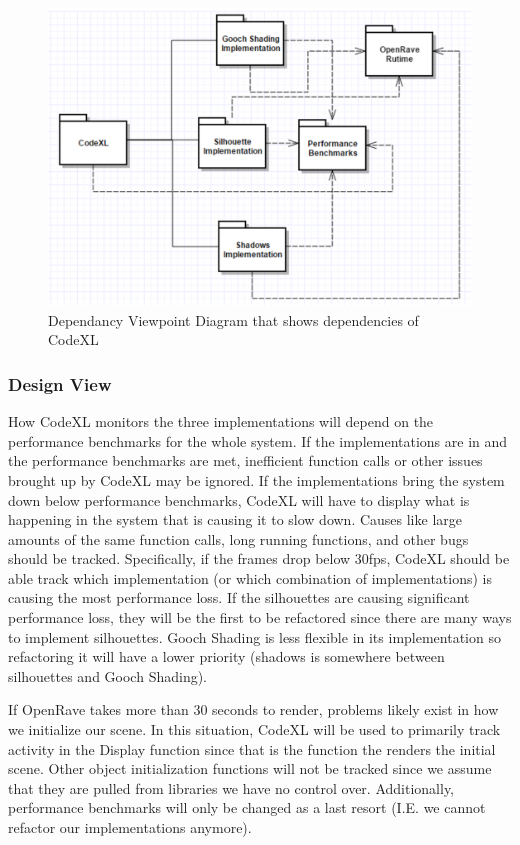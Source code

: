 ﻿\documentclass[10pt,journal,compsoc,draftclsnofoot]{IEEEtran}
\begin{document}
\begin{flushleft}
\begin{figure} [H]
  \includegraphics[scale=0.9]{CodeXL_Dependency.eps}
  \caption
{ \newline \hspace{\linewidth}
Dependancy Viewpoint Diagram that shows dependencies of CodeXL}
  \label{fig:CodeXL_Dependency}
\end{figure}

\subsubsection{Design View}
How CodeXL monitors the three implementations will depend on the performance benchmarks for the whole system.
If the implementations are in and the performance benchmarks are met, inefficient function calls or other issues brought up by CodeXL may be ignored.
If the implementations bring the system down below performance benchmarks, CodeXL will have to display what is happening in the system that is causing it to slow down.
Causes like large amounts of the same function calls, long running functions, and other bugs should be tracked.
Specifically, if the frames drop below 30fps, CodeXL should be able track which implementation (or which combination of implementations) is causing the most performance loss.
If the silhouettes are causing significant performance loss, they will be the first to be refactored since there are many ways to implement silhouettes. 
Gooch Shading is less flexible in its implementation so refactoring it will have a lower priority (shadows is somewhere between silhouettes and Gooch Shading).

If OpenRave takes more than 30 seconds to render, problems likely exist in how we initialize our scene.
In this situation, CodeXL will be used to primarily track activity in the Display function since that is the function the renders the initial scene.
Other object initialization functions will not be tracked since we assume that they are pulled from libraries we have no control over.
Additionally, performance benchmarks will only be changed as a last resort (I.E. we cannot refactor our implementations anymore).


\end{flushleft}
\end{document}
